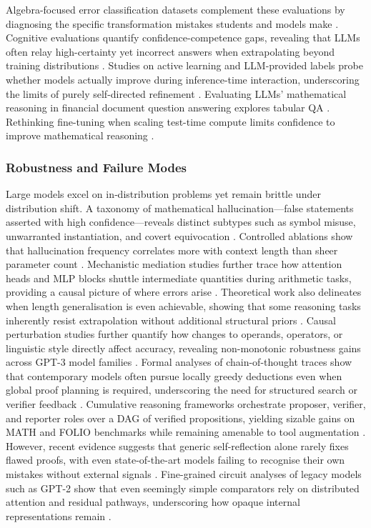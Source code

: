 \documentclass[acmsmall,anonymous]{acmart}
\begin{document}
Algebra-focused error classification datasets complement these evaluations by diagnosing the specific transformation mistakes students and models make \cite{ni-2023-algebra-error}.  Cognitive evaluations quantify confidence-competence gaps, revealing that LLMs often relay high-certainty yet incorrect answers when extrapolating beyond training distributions \cite{singh-2023-confidence-gap}.  Studies on active learning and LLM-provided labels probe whether models actually improve during inference-time interaction, underscoring the limits of purely self-directed refinement \cite{chen-2024-active-learning-llm}. Evaluating LLMs' mathematical reasoning in financial document question answering explores tabular QA \cite{srivastava2024evaluating}. Rethinking fine-tuning when scaling test-time compute limits confidence to improve mathematical reasoning \cite{chen2025a}.

\subsubsection{Robustness and Failure Modes}\label{sec:robust}
Large models excel on in‐distribution problems yet remain brittle under distribution shift.  A taxonomy of mathematical hallucination—false statements asserted with high confidence—reveals distinct subtypes such as symbol misuse, unwarranted instantiation, and covert equivocation \cite{sun2024benchmarking}.  Controlled ablations show that hallucination frequency correlates more with context length than sheer parameter count \cite{yang2023steamroller}.  Mechanistic mediation studies further trace how attention heads and MLP blocks shuttle intermediate quantities during arithmetic tasks, providing a causal picture of where errors arise \cite{stolfo-2023-causal-mediation}.  Theoretical work also delineates when length generalisation is even achievable, showing that some reasoning tasks inherently resist extrapolation without additional structural priors \cite{xiao2023conditionslengthgeneralizationlearning}.  Causal perturbation studies further quantify how changes to operands, operators, or linguistic style directly affect accuracy, revealing non-monotonic robustness gains across GPT-3 model families \cite{stolfo-2023-causal}.  Formal analyses of chain-of-thought traces show that contemporary models often pursue locally greedy deductions even when global proof planning is required, underscoring the need for structured search or verifier feedback \cite{saparov-2023-greedy}.  Cumulative reasoning frameworks orchestrate proposer, verifier, and reporter roles over a DAG of verified propositions, yielding sizable gains on MATH and FOLIO benchmarks while remaining amenable to tool augmentation \cite{zhang-2025-cumulative-reasoning}.  However, recent evidence suggests that generic self-reflection alone rarely fixes flawed proofs, with even state-of-the-art models failing to recognise their own mistakes without external signals \cite{huang-2024-llm-self-correct}.  Fine-grained circuit analyses of legacy models such as GPT-2 show that even seemingly simple comparators rely on distributed attention and residual pathways, underscoring how opaque internal representations remain \cite{hanna-2023-greater-than}.  
\end{document}
